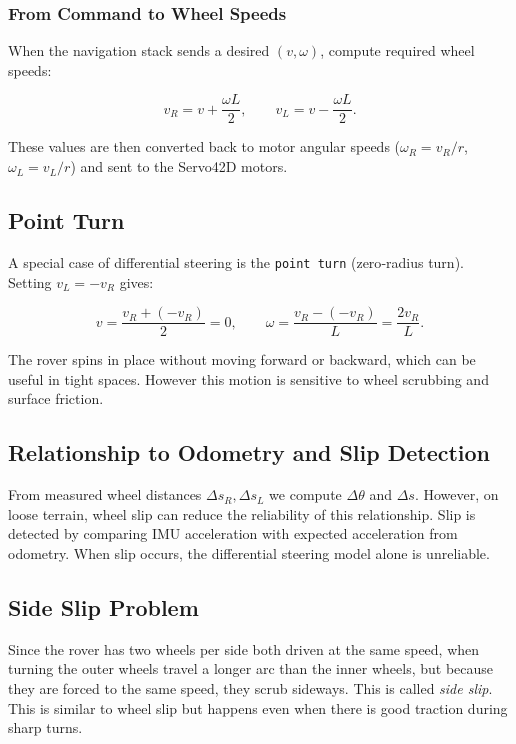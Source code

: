 \subsubsection{From Command to Wheel Speeds}
When the navigation stack sends a desired \((v, \omega)\), compute required wheel speeds:

\begin{equation}
v_R = v + \frac{\omega L}{2}, \qquad
v_L = v - \frac{\omega L}{2}.
\end{equation}

These values are then converted back to motor angular speeds (\(\omega_R = v_R / r\), \(\omega_L = v_L / r\)) and sent to the Servo42D motors.

\subsection{Point Turn}
A special case of differential steering is the \texttt{point turn} (zero‑radius turn). Setting \(v_L = -v_R\) gives:

\begin{equation}
v = \frac{v_R + (-v_R)}{2} = 0, \qquad
\omega = \frac{v_R - (-v_R)}{L} = \frac{2v_R}{L}.
\end{equation}

The rover spins in place without moving forward or backward, which can be useful in tight spaces. However this motion is sensitive to wheel scrubbing and surface friction.

\subsection{Relationship to Odometry and Slip Detection}
From measured wheel distances \(\Delta s_R, \Delta s_L\) we compute \(\Delta\theta\) and \(\Delta s\). 
However, on loose terrain, wheel slip can reduce the reliability of this relationship.
Slip is detected by comparing IMU acceleration with expected acceleration from odometry. When slip occurs, the differential steering model alone is unreliable.

\subsection{Side Slip Problem}
Since the rover has two wheels per side both driven at the same speed, 
when turning the outer wheels travel a longer arc than the inner wheels, but because they are forced to the same speed, 
they scrub sideways. This is called \textit{side slip}. This is similar to wheel slip but happens even when there is good traction during sharp turns.

